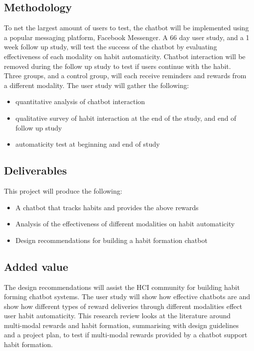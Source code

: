\subsection*{Methodology}
To net the largest amount of users to test, the chatbot will be implemented using a popular messaging platform, Facebook Messenger.\newline
\newline
A 66 day user study, and a 1 week follow up study, will test the success of the chatbot by evaluating effectiveness of each modality on habit automaticity. Chatbot interaction will be removed during the follow up study to test if users continue with the habit. Three groups, and a control group, will each receive reminders and rewards from a different modality.\newline
\newline
The user study will gather the following:
\begin{itemize}
  \item quantitative analysis of chatbot interaction
  \item qualitative survey of habit interaction at the end of the study, and end of follow up study
  \item automaticity test at beginning and end of study
\end{itemize}

\subsection*{Deliverables}
This project will produce the following:\newline

\begin{itemize}
  \item A chatbot that tracks habits and provides the above rewards
  \item Analysis of the effectiveness of different modalities on habit automaticity
  \item Design recommendations for building a habit formation chatbot
\end{itemize}

\subsection*{Added value}
The design recommendations will assist the HCI community for building habit forming chatbot systems. The user study will show how effective chatbots are and show how different types of reward deliveries through different modalities effect user habit automaticity.\newline
\newline
This research review looks at the literature around multi-modal rewards and habit formation, summarising with design guidelines and a project plan, to test if multi-modal rewards provided by a chatbot support habit formation.

\newpage

